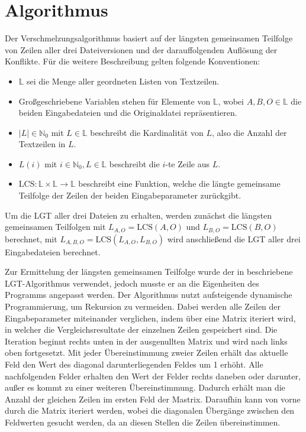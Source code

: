 \documentclass[a4paper,titlepage,12pt]{scrartcl}
\begin{document}
\section{Algorithmus}
\label{sec:algorithm}
Der Verschmelzungsalgorithmus basiert auf der längsten gemeinsamen Teilfolge von Zeilen aller drei Dateiversionen und der darauffolgenden Auflösung der Konflikte.
Für die weitere Beschreibung gelten folgende Konventionen:
\begin{itemize}
\item $\mathbb{L}$ sei die Menge aller geordneten Listen von Textzeilen.
\item Großgeschriebene Variablen stehen für Elemente von $\mathbb{L}$,
wobei $A, B, O \in \mathbb{L}$ die beiden Eingabedateien und die Originaldatei repräsentieren.
\item $|L| \in \mathbb{N}_0$ mit $L \in \mathbb{L}$ beschreibt die Kardinalität von $L$,
also die Anzahl der Textzeilen in $L$.
\item $L(i)$ mit $i \in \mathbb{N}_0, L \in \mathbb{L}$ beschreibt die $i$-te Zeile aus $L$.
\item $\mbox{LCS}: \mathbb{L} \times \mathbb{L} \rightarrow \mathbb{L}$ beschreibt eine Funktion,
welche die längte gemeinsame Teilfolge der Zeilen der beiden Eingabeparameter zurückgibt.
\end{itemize}

Um die LGT aller drei Dateien zu erhalten,
werden zunächst die längsten gemeinsamen Teilfolgen mit $L_{A,O} = \mbox{LCS}(A, O)$ und $L_{B,O} = \mbox{LCS}(B, O)$ berechnet,
mit $L_{A,B,O} = \mbox{LCS}(L_{A,O}, L_{B,O})$ wird anschließend die LGT aller drei Eingabedateien berechnet.

Zur Ermittelung der längsten gemeinsamen Teilfolge wurde der in \citet{web:eppstein} beschriebene LGT-Algorithmus verwendet,
jedoch musste er an die Eigenheiten des Programms angepasst werden.
Der Algorithmus nutzt aufsteigende dynamische Programmierung,
um Rekursion zu vermeiden.
Dabei werden alle Zeilen der Eingabeparameter miteinander verglichen,
indem über eine Matrix iteriert wird,
in welcher die Vergleichsresultate der einzelnen Zeilen gespeichert sind.
Die Iteration beginnt rechts unten in der ausgenullten Matrix und wird nach links oben fortgesetzt.
Mit jeder Übereinstimmung zweier Zeilen erhält das aktuelle Feld den Wert des diagonal darunterliegenden Feldes um 1 erhöht.
Alle nachfolgenden Felder erhalten den Wert der Felder rechts daneben oder darunter,
außer es kommt zu einer weiteren Übereinstimmung.
Dadurch erhält man die Anzahl der gleichen Zeilen im ersten Feld der Mastrix.
Daraufhin kann von vorne durch die Matrix iteriert werden,
wobei die diagonalen Übergänge zwischen den Feldwerten gesucht werden,
da an diesen Stellen die Zeilen übereinstimmen.
\end{document}
